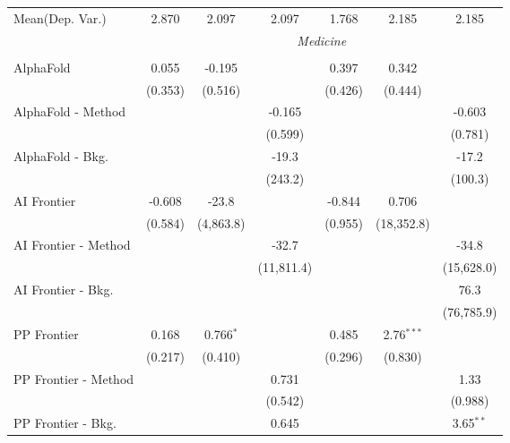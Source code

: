\begin{tabular}{lcccccc}
Mean(Dep. Var.) & 2.870 & 2.097 & 2.097 & 1.768 & 2.185 & 2.185 \\
 & \multicolumn{6}{c}{\textit{Medicine}} \\ \\
   AlphaFold            & 0.055   & -0.195      &            & 0.397   & 0.342        &   \\   
                        & (0.353) & (0.516)     &            & (0.426) & (0.444)      &   \\   
   AlphaFold - Method   &         &             & -0.165     &         &              & -0.603\\   
                        &         &             & (0.599)    &         &              & (0.781)\\   
   AlphaFold - Bkg.     &         &             & -19.3      &         &              & -17.2\\   
                        &         &             & (243.2)    &         &              & (100.3)\\   
   AI Frontier          & -0.608  & -23.8       &            & -0.844  & 0.706        &   \\   
                        & (0.584) & (4,863.8)   &            & (0.955) & (18,352.8)   &   \\   
   AI Frontier - Method &         &             & -32.7      &         &              & -34.8\\   
                        &         &             & (11,811.4) &         &              & (15,628.0)\\   
   AI Frontier - Bkg.   &         &             &            &         &              & 76.3\\   
                        &         &             &            &         &              & (76,785.9)\\   
   PP Frontier          & 0.168   & 0.766$^{*}$ &            & 0.485   & 2.76$^{***}$ &   \\   
                        & (0.217) & (0.410)     &            & (0.296) & (0.830)      &   \\   
   PP Frontier - Method &         &             & 0.731      &         &              & 1.33\\   
                        &         &             & (0.542)    &         &              & (0.988)\\   
   PP Frontier - Bkg.   &         &             & 0.645      &         &              & 3.65$^{**}$\\   

\end{tabular}
